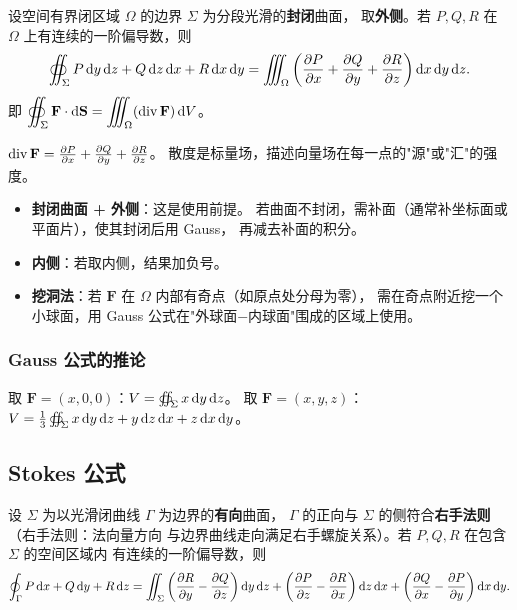 \documentclass{article}
\DeclareMathOperator{\divergence}{div}
\begin{document}
\begin{theorem}[Gauss 公式]
  设空间有界闭区域 $\Omega$ 的边界 $\Sigma$ 为分段光滑的\textbf{封闭}曲面，
  取\textbf{外侧}。若 $P, Q, R$ 在 $\Omega$ 上有连续的一阶偏导数，则
  \[
    \oiint_\Sigma P \,\mathrm{d} y\,\mathrm{d} z + Q \,\mathrm{d} z\,\mathrm{d} x + R \,\mathrm{d} x\,\mathrm{d} y
    = \iiint_\Omega \left( \frac{\partial P}{\partial x} + \frac{\partial Q}{\partial y} +
    \frac{\partial R}{\partial z} \right) \mathrm{d} x\,\mathrm{d} y\,\mathrm{d} z.
  \]
  即 $\displaystyle\oiint_\Sigma \mathbf{F} \cdot \dif\mathbf{S}
  = \iiint_\Omega (\divergence \mathbf{F}) \,\dif V$。
\end{theorem}

\begin{remark}[散度]
  $\divergence \mathbf{F} = \pdfFrac{P}{x} + \pdfFrac{Q}{y} + \pdfFrac{R}{z}$。
  散度是标量场，描述向量场在每一点的"源"或"汇"的强度。
\end{remark}

\begin{remark}
  \begin{itemize}
    \item \textbf{封闭曲面 + 外侧}：这是使用前提。
      若曲面不封闭，需补面（通常补坐标面或平面片），使其封闭后用 Gauss，
      再减去补面的积分。
    \item \textbf{内侧}：若取内侧，结果加负号。
    \item \textbf{挖洞法}：若 $\mathbf{F}$ 在 $\Omega$ 内部有奇点（如原点处分母为零），
      需在奇点附近挖一个小球面，用 Gauss 公式在"外球面$-$内球面"围成的区域上使用。
  \end{itemize}
\end{remark}

\subsubsection*{Gauss 公式的推论}

\begin{corollary}[体积公式]
  取 $\mathbf{F} = (x, 0, 0)$：$V = \oiint_\Sigma x \,\mathrm{d} y\,\mathrm{d} z$。
  取 $\mathbf{F} = (x, y, z)$：$V = \frac{1}{3}\oiint_\Sigma x\,\mathrm{d}
  y\,\mathrm{d} z + y\,\mathrm{d} z\,\mathrm{d} x + z\,\mathrm{d} x\,\mathrm{d} y$。
\end{corollary}

\subsection{Stokes 公式}
\label{sec:stokes}

\begin{theorem}[Stokes 公式]
  设 $\Sigma$ 为以光滑闭曲线 $\Gamma$ 为边界的\textbf{有向}曲面，
  $\Gamma$ 的正向与 $\Sigma$ 的侧符合\textbf{右手法则}（右手法则：法向量方向
  与边界曲线走向满足右手螺旋关系）。若 $P, Q, R$ 在包含 $\Sigma$ 的空间区域内
  有连续的一阶偏导数，则
  \[
    \oint_\Gamma P \,\mathrm{d} x + Q \,\mathrm{d} y + R \,\mathrm{d} z
    = \iint_\Sigma
    \left(\frac{\partial R}{\partial y} - \frac{\partial Q}{\partial z}\right) \mathrm{d} y\,\mathrm{d} z
    + \left(\frac{\partial P}{\partial z} - \frac{\partial R}{\partial x}\right) \mathrm{d} z\,\mathrm{d} x
    + \left(\frac{\partial Q}{\partial x} - \frac{\partial P}{\partial y}\right) \mathrm{d} x\,\mathrm{d} y.
  \]
\end{theorem}
\end{document}
